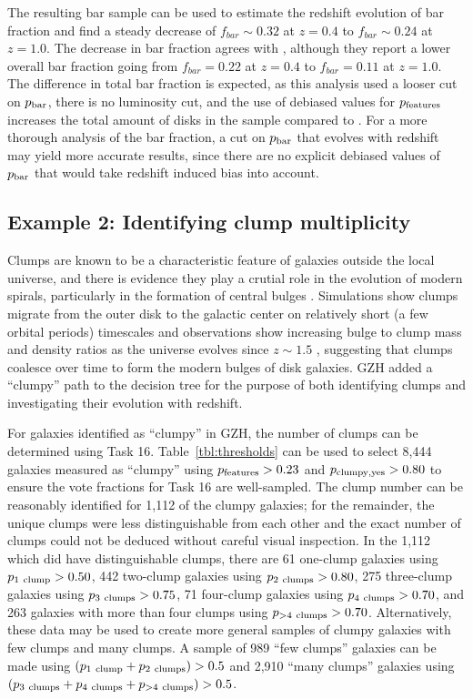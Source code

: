 \documentclass[twocolumn]{aastex6}
\begin{document}
The resulting bar sample can be used to estimate the redshift evolution of bar fraction and find a steady decrease of $f_{bar} \sim 0.32$ at $z=0.4$ to $f_{bar} \sim 0.24$ at $z=1.0$. The decrease in bar fraction agrees with \citet{mel14}, although they report a lower overall bar fraction going from $f_{bar}=0.22$ at $z=0.4$ to $f_{bar}=0.11$ at $z=1.0$. The difference in total bar fraction is expected, as this analysis used a looser cut on $p_{\rm bar}$, there is no luminosity cut, and the use of debiased values for $p_{\rm features}$ increases the total amount of disks in the sample compared to \citet{mel14}. For a more thorough analysis of the bar fraction, a cut on $p_{\rm bar}$ that evolves with redshift may yield more accurate results, since there are no explicit debiased values of $p_{\rm bar}$ that would take redshift induced bias into account. 

\subsection{Example 2: Identifying clump multiplicity}
Clumps are known to be a characteristic feature of galaxies outside the local universe, and there is evidence they play a crutial role in the evolution of modern spirals, particularly in the formation of central bulges \citep{elm05,elm14,guo15,beh16}. Simulations show clumps migrate from the outer disk to the galactic center on relatively short (a few orbital periods) timescales \citep{man15} and observations show increasing bulge to clump mass and density ratios as the universe evolves since $z\sim 1.5$ \citep{elm09}, suggesting that clumps coalesce over time to form the modern bulges of disk galaxies. GZH added a ``clumpy'' path to the decision tree for the purpose of both identifying clumps and investigating their evolution with redshift. 

For galaxies identified as ``clumpy'' in GZH, the number of clumps can be determined using Task 16. Table~\ref{tbl:thresholds} can be used to select 8,444 galaxies measured as ``clumpy'' using $p_{\rm features} > 0.23$ and $p_{\rm clumpy,yes}>0.80$ to ensure the vote fractions for Task 16 are well-sampled. The clump number can be reasonably identified for 1,112 of the clumpy galaxies; for the remainder, the unique clumps were less distinguishable from each other and the exact number of clumps could not be deduced without careful visual inspection. In the 1,112 which did have distinguishable clumps, there are 61 one-clump galaxies using $p_{\rm 1~clump}>0.50$, 442 two-clump galaxies using $p_{\rm 2~clumps}>0.80$, 275 three-clump galaxies using $p_{\rm 3~clumps}>0.75$, 71 four-clump galaxies using $p_{\rm 4~clumps} > 0.70$, and 263 galaxies with more than four clumps using $p_{\rm >4~clumps}>0.70$. Alternatively, these data may be used to create more general samples of clumpy galaxies with few clumps and many clumps. A sample of 989 ``few clumps'' galaxies can be made using $(p_{\rm 1~clump} + p_{\rm 2~clumps}) > 0.5$ and 2,910 ``many clumps'' galaxies using $(p_{\rm 3~clumps}+p_{\rm 4~clumps}+p_{\rm >4~clumps})>0.5$.
\end{document}
